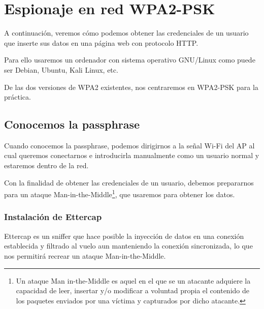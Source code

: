\chapter{Espionaje en red WPA2-PSK}
A continuación, veremos cómo podemos obtener las credenciales de un usuario que inserte sus datos en una página web con protocolo HTTP.

Para ello usaremos un ordenador con sistema operativo GNU/Linux como puede ser Debian, Ubuntu, Kali Linux, etc.

\Nota De las dos versiones de WPA2 existentes, nos centraremos en WPA2-PSK para la práctica.
\section{Conocemos la passphrase}
Cuando conocemos la passphrase, podemos dirigirnos a la señal Wi-Fi del AP al cual queremos conectarnos e introducirla manualmente como un usuario normal y estaremos dentro de la red.

Con la finalidad de obtener las credenciales de un usuario, debemos prepararnos para un ataque Man-in-the-Middle\footnote{Un ataque Man in-the-Middle es aquel en el que se un atacante adquiere la capacidad de leer, insertar y/o modificar a voluntad propia el contenido de los paquetes enviados por una víctima y capturados por dicho atacante.}, que usaremos para obtener los datos.

\subsection{Instalación de Ettercap}
Ettercap es un sniffer que hace posible la inyección de datos en una conexión establecida y filtrado al vuelo aun manteniendo la conexión sincronizada, lo que nos permitirá recrear un ataque Man-in-the-Middle.

